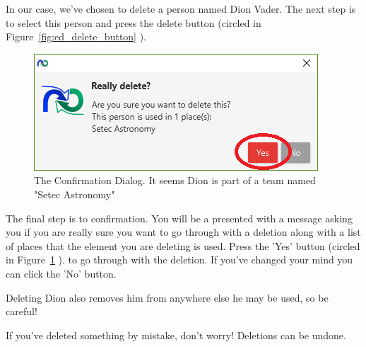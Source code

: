In our case, we've chosen to delete a person named Dion Vader. The next step is to select this person and press the delete button (circled in Figure~\ref{fig:ed_delete_button} ).

\begin{figure}[h]
	\centering
	\includegraphics[width=\textwidth]{images/screenshots/deletion3.PNG}
	\caption{The Confirmation Dialog. It seems Dion is part of a team named "Setec Astronomy"}
	\label{fig:ed_confirm_dialog}
\end{figure}

The final step is to confirmation. You will be a presented with a message asking you if you are really sure you want to go through with a deletion along with a list of places that the element you are deleting is used. Press the 'Yes' button (circled in Figure~\ref{fig:ed_confirm_dialog} ). to go through with the deletion. If you've changed your mind you can click the 'No' button. 

Deleting Dion also removes him from anywhere else he may be used, so be careful!

If you've deleted something by mistake, don't worry! Deletions can be undone.